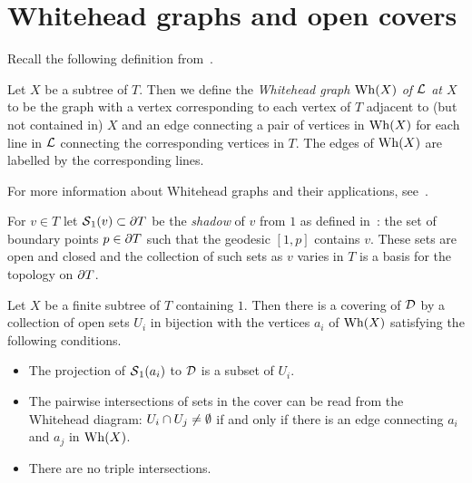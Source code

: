 \section{Whitehead graphs and open covers}\label{section:whitehead_diagrams}

Recall the following definition from~\cite{cashenmacura11}.

\begin{definition}
  Let $X$ be a subtree of $T$.
  Then we define the \emph{Whitehead graph $\mathrm{Wh}(X)$ of $\mathcal{L}$ at $X$} to be the graph with a vertex corresponding to each vertex of $T$ adjacent to (but not contained in) $X$ and an edge connecting a pair of vertices in $\mathrm{Wh}(X)$ for each line in $\mathcal{L}$ connecting the corresponding vertices in $T$.
  The edges of $\mathrm{Wh}(X)$ are labelled by the corresponding lines.
\end{definition}

For more information about Whitehead graphs and their applications, see~\cite{manning10}.

\begin{definition}
  For $v \in T$ let $\operatorname{\mathcal{S}}_1(v) \subset \partial T$ be the \emph{shadow} of $v$ from $1$ as defined in~\cite{cashenmacura11}: the set of boundary points $p \in \partial T$ such that the geodesic $[1, p]$ contains $v$.
  These sets are open and closed and the collection of such sets as $v$ varies in $T$ is a basis for the topology on $\partial T$.
\end{definition}

\begin{lemma}\label{lemma:constructing_a_cover}
  Let $X$ be a finite subtree of\/ $T$ containing $1$.
  Then there is a covering of\/ $\mathcal{D}$ by a collection of open sets $U_i$ in bijection with the vertices $a_i$ of\/ $\mathrm{Wh}(X)$ satisfying the following conditions.
\begin{itemize}
  \item The projection of\/ $\operatorname{\mathcal{S}}_1(a_i)$ to\/ $\mathcal{D}$ is a subset of\/ $U_i$.
  \item The pairwise intersections of sets in the cover can be read from the Whitehead diagram: $U_i \cap U_j \neq \emptyset$ if and only if there is an edge connecting $a_i$ and $a_j$ in $\mathrm{Wh}(X)$.
  \item There are no triple intersections.
  \end{itemize}
\end{lemma}

